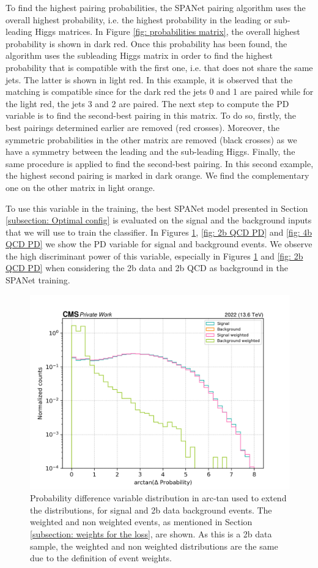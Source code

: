 To find the highest pairing probabilities, the SPANet pairing algorithm uses the overall highest probability, i.e. the highest probability in the leading or sub-leading Higgs matrices. In Figure \ref{fig: probabilities matrix}, the overall highest probability is shown in dark red. Once this probability has been found, the algorithm uses the subleading Higgs matrix in order to find the highest probability that is compatible with the first one, i.e. that does not share the same jets. The latter is shown in light red. In this example, it is observed that the matching is compatible since for the dark red the jets 0 and 1 are paired while for the light red, the jets 3 and 2 are paired. The next step to compute the PD variable is to find the second-best pairing in this matrix. To do so, firstly, the best pairings determined earlier are removed (red crosses). Moreover, the symmetric probabilities in the other matrix are removed (black crosses) as we have a symmetry between the leading and the sub-leading Higgs. Finally, the same procedure is applied to find the second-best pairing. In this second example, the highest second pairing is marked in dark orange. We find the complementary one on the other matrix in light orange.

To use this variable in the training, the best SPANet model presented in Section \ref{subsection: Optimal config} is evaluated on the signal and the background inputs that we will use to train the classifier. 
In Figures \ref{fig: 2b data PD}, \ref{fig: 2b QCD PD} and \ref{fig: 4b QCD PD} we show the PD variable for signal and background events. We observe the high discriminant power of this variable, especially in Figures \ref{fig: 2b data PD} and \ref{fig: 2b QCD PD} when considering the 2b data and 2b QCD as background in the SPANet training.

\begin{figure}[hbt]
    \centering
    \includegraphics[width=0.7\linewidth]{Images/7.S:B/Prob diff/2b data reduced.png}
    \caption{Probability difference variable distribution in arc-tan used to extend the distributions, for signal and 2b data background events. The weighted and non weighted events, as mentioned in Section \ref{subsection: weights for the loss}, are shown. As this is a 2b data sample, the weighted and non weighted distributions are the same due to the definition of event weights.}
    \label{fig: 2b data PD}
\end{figure}

